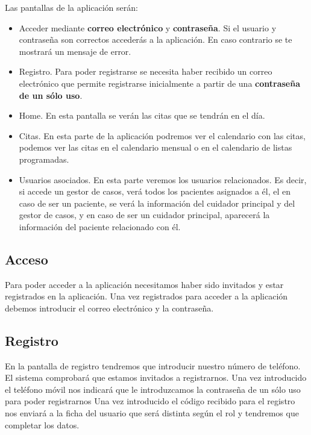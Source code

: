 Las pantallas de la aplicación serán:
\begin{itemize}
	\item Acceder mediante \textbf{correo electrónico} y \textbf{contraseña}. Si el usuario y contraseña son correctos accederás a la aplicación. En caso contrario se te mostrará un mensaje de error.
	\item Registro. Para poder registrarse se necesita haber recibido un correo electrónico que permite registrarse inicialmente a partir de una \textbf{contraseña de un sólo uso}.
	\item Home. En esta pantalla se verán las citas que se tendrán en el día.
	\item Citas. En esta parte de la aplicación podremos ver el calendario con las citas, podemos ver las citas en el calendario mensual o en el calendario de listas programadas.
	\item Usuarios asociados. En esta parte veremos los usuarios relacionados. Es decir, si accede un gestor de casos, verá todos los pacientes asignados a él, el en caso de ser un paciente, se verá la información del cuidador principal y del gestor de casos, y en caso de ser un cuidador principal, aparecerá la información del paciente relacionado con él. 
\end{itemize}

\subsection{Acceso}
Para poder acceder a la aplicación necesitamos haber sido invitados y estar registrados en la aplicación. Una vez registrados para acceder a la aplicación debemos introducir el correo electrónico y la contraseña.
\subsection{Registro}
En la pantalla de registro tendremos que introducir nuestro número de teléfono. El sistema comprobará que estamos invitados a registrarnos.
Una vez introducido el teléfono móvil nos indicará que le introduzcamos la contraseña de un sólo uso para poder registrarnos
Una vez introducido el código recibido para el registro nos enviará a la ficha del usuario que será distinta según el rol y tendremos que completar los datos.

